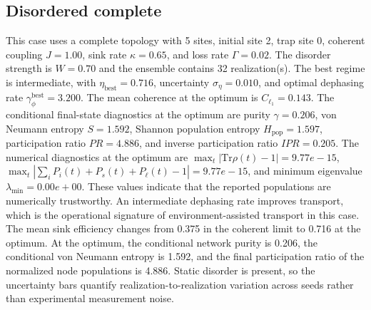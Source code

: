 \subsection{Disordered complete}
This case uses a complete topology with 5 sites, initial site 2, trap site 0, coherent coupling $J=1.00$, sink rate $\kappa=0.65$, and loss rate $\Gamma=0.02$. The disorder strength is $W=0.70$ and the ensemble contains 32 realization(s).
The best regime is intermediate, with $\eta_{\mathrm{best}}=0.716$, uncertainty $\sigma_\eta=0.010$, and optimal dephasing rate $\gamma_\phi^{\mathrm{best}}=3.200$. The mean coherence at the optimum is $C_{\ell_1}=0.143$.
The conditional final-state diagnostics at the optimum are purity $\gamma=0.206$, von Neumann entropy $S=1.592$, Shannon population entropy $H_\mathrm{pop}=1.597$, participation ratio $PR=4.886$, and inverse participation ratio $IPR=0.205$.
The numerical diagnostics at the optimum are $\max_t |\mathrm{Tr}\rho(t)-1|=9.77e-15$, $\max_t |\sum_i P_i(t)+P_s(t)+P_\ell(t)-1|=9.77e-15$, and minimum eigenvalue $\lambda_\mathrm{min}=0.00e+00$. These values indicate that the reported populations are numerically trustworthy.
An intermediate dephasing rate improves transport, which is the operational signature of environment-assisted transport in this case. The mean sink efficiency changes from 0.375 in the coherent limit to 0.716 at the optimum. At the optimum, the conditional network purity is 0.206, the conditional von Neumann entropy is 1.592, and the final participation ratio of the normalized node populations is 4.886. Static disorder is present, so the uncertainty bars quantify realization-to-realization variation across seeds rather than experimental measurement noise.
